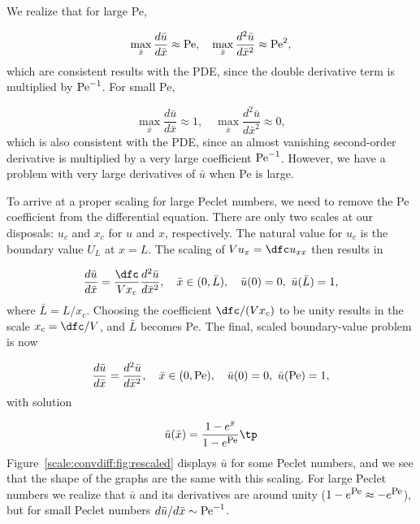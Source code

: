 \documentclass[graybox,envcountchap,sectrefs,final]{svmonodo}
\begin{document}
We realize that for large Pe,

\[ \max_{\bar x}\frac{d\bar u}{d\bar x} \approx \hbox{Pe},\quad
\max_{\bar x}\frac{d^2\bar u}{d\bar x^2} \approx \hbox{Pe}^{2},\]
which are consistent results with the PDE, since the double derivative term
is multiplied by $\hbox{Pe}^{-1}$.
For small Pe,

\[ \max_{\bar x}\frac{d\bar u}{d\bar x}\approx 1,\quad
   \max_{\bar x}\frac{d^2\bar u}{d\bar x^2} \approx 0,\]
which is also consistent with the PDE,
since an almost vanishing second-order derivative
is multiplied by a very large coefficient $\hbox{Pe}^{-1}$.
However, we have a problem with very large
derivatives of $\bar u$ when Pe is large.

To arrive at a proper scaling for large Peclet numbers,
we need to remove the Pe coefficient
from the differential equation. There are only two scales at our
disposals: $u_c$ and $x_c$ for $u$ and $x$, respectively.
The natural value for $u_c$ is the boundary value $U_L$ at $x=L$.
The scaling of $Vu_x = \dfc u_{xx}$ then results in

\[ \frac{d\bar u}{d\bar x} = \frac{\dfc}{Vx_c}\frac{d^2\bar u}{d\bar x^2},
\quad \bar x\in (0,\bar L),\quad \bar u(0)=0,\ \bar u(\bar L)=1,\]
where $\bar L = L/x_c$. Choosing the coefficient $\dfc/(Vx_c)$ to
be unity results in the scale $x_c=\dfc/V$, and $\bar L$ becomes Pe.
The final, scaled boundary-value
problem is now

\[ \frac{d\bar u}{d\bar x} = \frac{d^2\bar u}{d\bar x^2},
\quad \bar x \in (0, \hbox{Pe}), \quad \bar u(0)=0,\ \bar u(\hbox{Pe})=1,\]
with solution

\[ \bar u(\bar x) = \frac{1 - e^{\bar x}}{1 - e^{\hbox{\footnotesize Pe}}}\tp\]
Figure~\ref{scale:convdiff:fig:rescaled} displays $\bar u$ for some
Peclet numbers, and we see that the shape of the graphs are the same
with this scaling. For large Peclet numbers we realize that $\bar u$
and its derivatives are around unity
($1-e^{\hbox{\footnotesize Pe}}\approx -e^{\hbox{\footnotesize Pe}}$),
but for small Peclet numbers $d\bar u/d\bar x \sim \hbox{Pe}^{-1}$.
\end{document}
